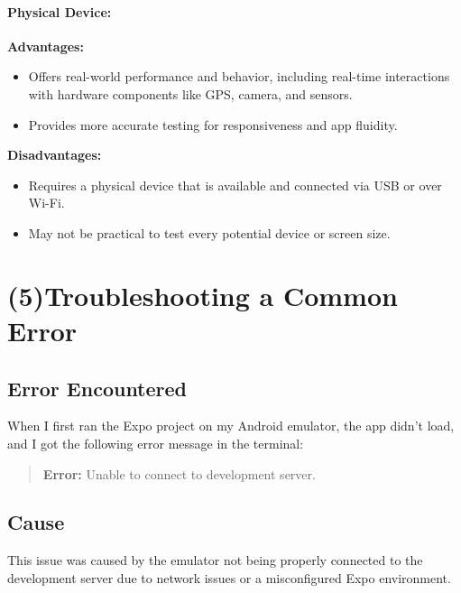 \documentclass[12pt]{article}
\begin{document}
\paragraph{Physical Device:}
\textbf{Advantages:}
\begin{itemize}
    \item Offers real-world performance and behavior, including real-time interactions with hardware components like GPS, camera, and sensors.
    \item Provides more accurate testing for responsiveness and app fluidity.
\end{itemize}
\textbf{Disadvantages:}
\begin{itemize}
    \item Requires a physical device that is available and connected via USB or over Wi-Fi.
    \item May not be practical to test every potential device or screen size.
\end{itemize}
\section*{(5)Troubleshooting a Common Error}
\subsection*{Error Encountered}
When I first ran the Expo project on my Android emulator, the app didn’t load, and I got the following error message in the terminal:
\begin{quote}
\textbf{Error:} Unable to connect to development server.
\end{quote}
\subsection*{Cause}
This issue was caused by the emulator not being properly connected to the development server due to network issues or a misconfigured Expo environment.
\end{document}
